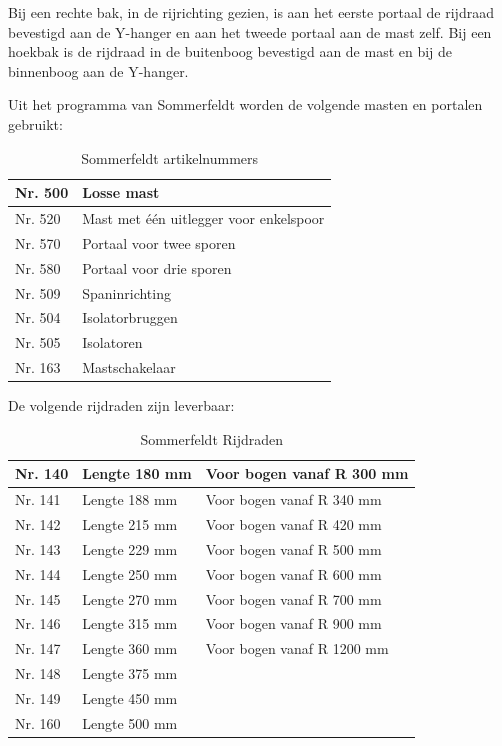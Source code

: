 \documentclass[12pt,a4paper]{report}
\begin{document}
Bij een rechte bak, in de rijrichting gezien, is aan het eerste portaal de rijdraad bevestigd aan de Y-hanger en aan het tweede portaal aan de mast zelf.
Bij een hoekbak is de rijdraad in de buitenboog bevestigd aan de mast en bij de binnenboog aan de Y-hanger.

Uit het programma van Sommerfeldt worden de volgende masten en portalen gebruikt:

\begin{table}[!ht]
\begin{tabular}{| l |p{8cm}|}
\hline
\cellcolor[gray]{0.84}Nr. 500&Losse mast\\
\hline
\cellcolor[gray]{0.84}Nr. 520&Mast met \'{e}\'{e}n uitlegger voor enkelspoor\\
\hline
\cellcolor[gray]{0.84}Nr. 570&Portaal voor twee sporen\\
\hline
\cellcolor[gray]{0.84}Nr. 580&Portaal voor drie sporen\\
\hline
\cellcolor[gray]{0.84}Nr. 509&Spaninrichting\\
\hline
\cellcolor[gray]{0.84}Nr. 504&Isolatorbruggen\\
\hline
\cellcolor[gray]{0.84}Nr. 505&Isolatoren\\
\hline
\cellcolor[gray]{0.84}Nr. 163&Mastschakelaar\\
\hline
\end{tabular}
\caption{Sommerfeldt artikelnummers}
\end{table}

De volgende rijdraden zijn leverbaar:

\begin{table}[!ht]
\begin{tabular}{| l | l | l |}
\hline
\cellcolor[gray]{0.84}Nr. 140&Lengte 180 mm&Voor bogen vanaf R 300 mm\\
\hline
\cellcolor[gray]{0.84}Nr. 141&Lengte 188 mm&Voor bogen vanaf R 340 mm\\
\hline
\cellcolor[gray]{0.84}Nr. 142&Lengte 215 mm&Voor bogen vanaf R 420 mm\\
\hline
\cellcolor[gray]{0.84}Nr. 143&Lengte 229 mm&Voor bogen vanaf R 500 mm\\
\hline
\cellcolor[gray]{0.84}Nr. 144&Lengte 250 mm&Voor bogen vanaf R 600 mm\\
\hline
\cellcolor[gray]{0.84}Nr. 145&Lengte 270 mm&Voor bogen vanaf R 700 mm\\
\hline
\cellcolor[gray]{0.84}Nr. 146&Lengte 315 mm&Voor bogen vanaf R 900 mm\\
\hline
\cellcolor[gray]{0.84}Nr. 147&Lengte 360 mm&Voor bogen vanaf R 1200 mm\\
\hline
\cellcolor[gray]{0.84}Nr. 148&Lengte 375 mm&\\
\hline
\cellcolor[gray]{0.84}Nr. 149&Lengte 450 mm&\\
\hline
\cellcolor[gray]{0.84}Nr. 160&Lengte 500 mm&\\
\hline
\end{tabular}
\caption{Sommerfeldt Rijdraden}
\end{table}
\end{document}
